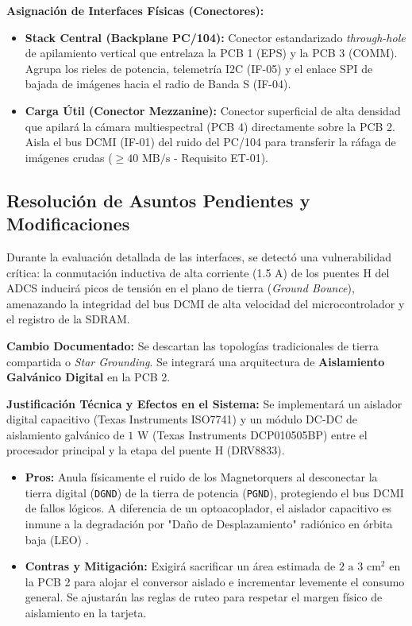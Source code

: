 \documentclass[11pt,a4paper]{article}
\begin{document}
\textbf{Asignación de Interfaces Físicas (Conectores):}
\begin{itemize}
    \item \textbf{Stack Central (Backplane PC/104):} Conector estandarizado \textit{through-hole} de apilamiento vertical que entrelaza la PCB 1 (EPS) y la PCB 3 (COMM). Agrupa los rieles de potencia, telemetría I2C (IF-05) y el enlace SPI de bajada de imágenes hacia el radio de Banda S (IF-04).
    \item \textbf{Carga Útil (Conector Mezzanine):} Conector superficial de alta densidad que apilará la cámara multiespectral (PCB 4) directamente sobre la PCB 2. Aisla el bus DCMI (IF-01) del ruido del PC/104 para transferir la ráfaga de imágenes crudas ($\ge 40\text{ MB/s}$ - Requisito ET-01).
\end{itemize}

\subsection{Resolución de Asuntos Pendientes y Modificaciones}
Durante la evaluación detallada de las interfaces, se detectó una vulnerabilidad crítica: la conmutación inductiva de alta corriente (1.5 A) de los puentes H del ADCS inducirá picos de tensión en el plano de tierra (\textit{Ground Bounce}), amenazando la integridad del bus DCMI de alta velocidad del microcontrolador y el registro de la SDRAM.

\textbf{Cambio Documentado:} Se descartan las topologías tradicionales de tierra compartida o \textit{Star Grounding}. Se integrará una arquitectura de \textbf{Aislamiento Galvánico Digital} en la PCB 2.

\textbf{Justificación Técnica y Efectos en el Sistema:}
Se implementará un aislador digital capacitivo (Texas Instruments ISO7741) y un módulo DC-DC de aislamiento galvánico de $1\text{ W}$ (Texas Instruments DCP010505BP) entre el procesador principal y la etapa del puente H (DRV8833). 
\begin{itemize}
    \item \textbf{Pros:} Anula físicamente el ruido de los Magnetorquers al desconectar la tierra digital (\texttt{DGND}) de la tierra de potencia (\texttt{PGND}), protegiendo el bus DCMI de fallos lógicos. A diferencia de un optoacoplador, el aislador capacitivo es inmune a la degradación por "Daño de Desplazamiento" radiónico en órbita baja (LEO) \cite{nasa_sst}.
    \item \textbf{Contras y Mitigación:} Exigirá sacrificar un área estimada de $2\text{ a }3\text{ cm}^2$ en la PCB 2 para alojar el conversor aislado e incrementar levemente el consumo general. Se ajustarán las reglas de ruteo para respetar el margen físico de aislamiento en la tarjeta.
\end{itemize}
\end{document}
